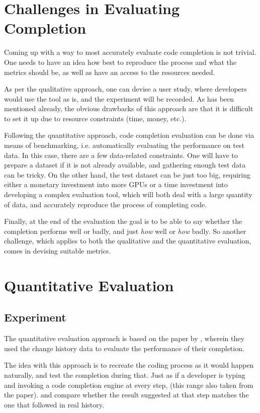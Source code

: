 \section{Challenges in Evaluating Completion}
\label{sec:Evaluation-Challenges}
Coming up with a way to most accurately evaluate code completion is not trivial. One needs to have an idea how best to reproduce the process and what the metrics should be, as well as have an access to the resources needed.

As per the qualitative approach, one can devise a user study, where developers would use the tool as is, and the experiment will be recorded. As has been mentioned already, the obvious drawbacks of this approach are that it is difficult to set it up due to resource constraints (time, money, etc.).

Following the quantitative approach, code completion evaluation can be done via means of benchmarking, i.e. automatically evaluating the performance on test data. In this case, there are a few data-related constraints. One will have to prepare a dataset if it is not already available, and gathering enough test data can be tricky. On the other hand, the test dataset can be just too big, requiring either a monetary investment into more GPUs or a time investment into developing a complex evaluation tool, which will both deal with a large quantity of data, and accurately reproduce the process of completing code.

Finally, at the end of the evaluation the goal is to be able to say whether the completion performs well or badly, and just \textit{how} well or \textit{how} badly. So another challenge, which applies to both the qualitative and the quantitative evaluation, comes in devising suitable metrics.

\section{Quantitative Evaluation}
\label{sec:Evaluation-Quantitative}
\subsection{Experiment}
The quantitative evaluation approach  is based on the paper by \cite{Robb08a}, wherein they used the change history data to evaluate the performance of their completion.

The idea with this approach is to recreate the coding process as it would happen naturally, and test the completion during that. Just as if a developer is typing and invoking a code completion engine at every step,  (this range also taken from the \cite{Robb08a} paper).  and compare whether the result suggested at that step matches the one that followed in real history.

